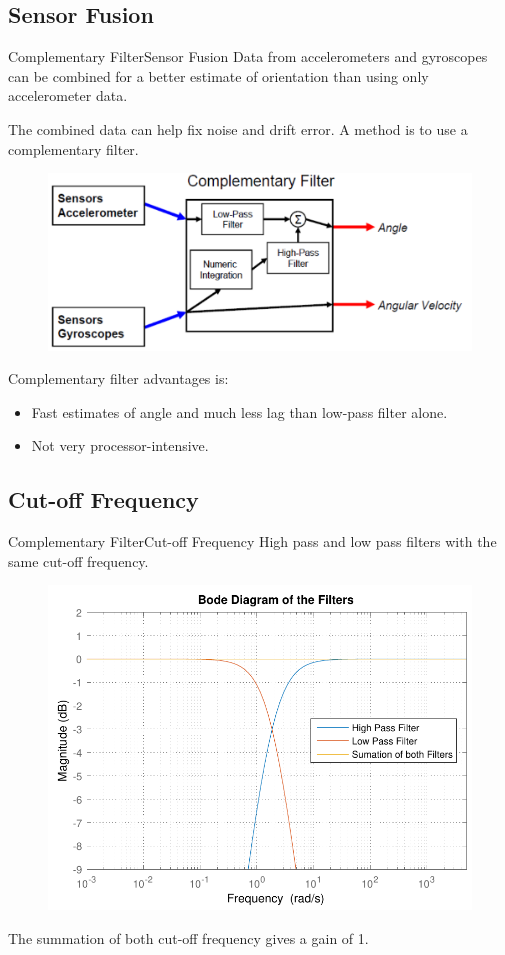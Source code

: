 \subsection{Sensor Fusion}
\begin{frame}{Complementary Filter}{Sensor Fusion}
Data from accelerometers and gyroscopes can be combined for a better estimate of orientation than using only accelerometer data.\linebreak

The combined data can help fix noise and drift error. A method is to use a complementary filter.
\begin{figure}
	\centering
	\includegraphics[scale=0.5]{Pictures/Complementary.pdf}
\end{figure}
Complementary filter advantages is:
\begin{itemize}
	\item {Fast estimates of angle and much less lag than low-pass filter alone.}
	\item {Not very processor-intensive.}
\end{itemize}
\end{frame}
\subsection{Cut-off Frequency}
\begin{frame}{Complementary Filter}{Cut-off Frequency}
High pass and low pass filters with the same cut-off frequency. 
\begin{figure}
	\centering
	\includegraphics[scale=0.5]{Pictures/bodeFilters.pdf}
\end{figure}
The summation of both cut-off frequency gives a gain of 1.
\end{frame}

